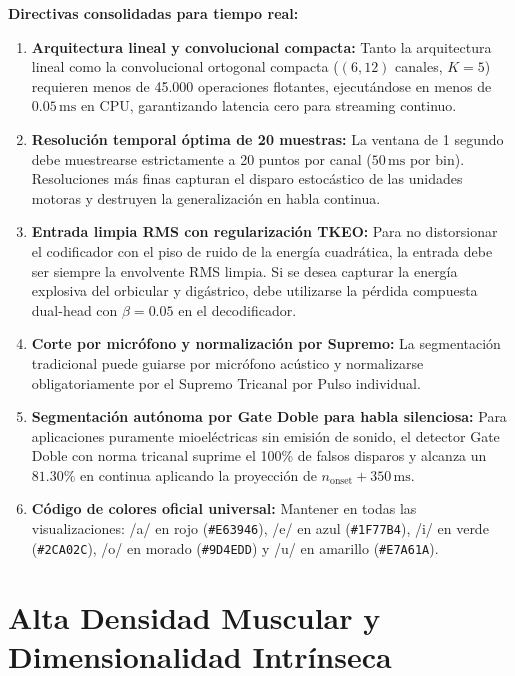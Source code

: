 \documentclass[11pt,a4paper,openany]{book}
\theoremstyle{definition}
\begin{document}
\textbf{Directivas consolidadas para tiempo real:}
\begin{enumerate}
    \item \textbf{Arquitectura lineal y convolucional compacta:} Tanto la arquitectura lineal como la convolucional ortogonal compacta ($(6, 12)$ canales, $K=5$) requieren menos de 45.000 operaciones flotantes, ejecutándose en menos de $0.05\,\text{ms}$ en CPU, garantizando latencia cero para streaming continuo.
    \item \textbf{Resolución temporal óptima de 20 muestras:} La ventana de 1 segundo debe muestrearse estrictamente a 20 puntos por canal ($50\,\text{ms}$ por bin). Resoluciones más finas capturan el disparo estocástico de las unidades motoras y destruyen la generalización en habla continua.
    \item \textbf{Entrada limpia RMS con regularización TKEO:} Para no distorsionar el codificador con el piso de ruido de la energía cuadrática, la entrada debe ser siempre la envolvente RMS limpia. Si se desea capturar la energía explosiva del orbicular y digástrico, debe utilizarse la pérdida compuesta dual-head con $\beta = 0.05$ en el decodificador.
    \item \textbf{Corte por micrófono y normalización por Supremo:} La segmentación tradicional puede guiarse por micrófono acústico y normalizarse obligatoriamente por el Supremo Tricanal por Pulso individual.
    \item \textbf{Segmentación autónoma por Gate Doble para habla silenciosa:} Para aplicaciones puramente mioeléctricas sin emisión de sonido, el detector Gate Doble con norma tricanal suprime el 100\% de falsos disparos y alcanza un $81.30\%$ en continua aplicando la proyección de $n_{\text{onset}} + 350\,\text{ms}$.
    \item \textbf{Código de colores oficial universal:} Mantener en todas las visualizaciones: /a/ en rojo (\texttt{\#E63946}), /e/ en azul (\texttt{\#1F77B4}), /i/ en verde (\texttt{\#2CA02C}), /o/ en morado (\texttt{\#9D4EDD}) y /u/ en amarillo (\texttt{\#E7A61A}).
\end{enumerate}
\part{Alta Densidad Muscular y Dimensionalidad Intrínseca}
\end{document}
